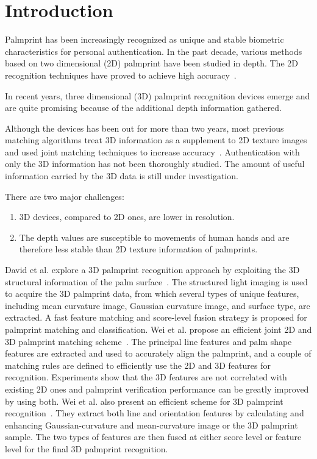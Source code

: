 \chapter{Introduction\label{ch:intro}}

Palmprint has been increasingly recognized as unique and stable biometric characteristics for personal authentication. In the past decade, various methods based on two dimensional (2D) palmprint have been studied in depth. The 2D recognition techniques have proved to achieve high accuracy~\cite{Kong:2009hj}.

In recent years, three dimensional (3D) palmprint recognition devices emerge and are quite promising because of the additional depth information gathered.

Although the devices has been out for more than two years, most previous matching algorithms treat 3D information as a supplement to 2D texture images and used joint matching techniques to increase accuracy~\cite{Li:2011ur, Li:2010en, Zhang:2009dp, Zhang:2008kc, Zhang:2010uu}. Authentication with only the 3D information has not been thoroughly studied. The amount of useful information carried by the 3D data is still under investigation.

There are two major challenges:

\begin{enumerate}
\item 3D devices, compared to 2D ones, are lower in resolution.
\item The depth values are susceptible to movements of human hands and are therefore less stable than 2D texture information of palmprints.
\end{enumerate}

David et al. explore a 3D palmprint recognition approach by exploiting the 3D structural information of the palm surface~\cite{Zhang:2009dp, Zhang:2008kc}. The structured light imaging is used to acquire the 3D palmprint data, from which several types of unique features, including mean curvature image, Gaussian curvature image, and surface type, are extracted. A fast feature matching and score-level fusion strategy is proposed for palmprint matching and classification. Wei et al. propose an efficient joint 2D and 3D palmprint matching scheme~\cite{Li:2010en}. The principal line features and palm shape features are extracted and used to accurately align the palmprint, and a couple of matching rules are defined to efficiently use the 2D and 3D features for recognition. Experiments show that the 3D features are not correlated with existing 2D ones and palmprint verification performance can be greatly improved by using both. Wei et al. also present an efficient scheme for 3D palmprint recognition~\cite{Li:2011ur}. They extract both line and orientation features by calculating and enhancing Gaussian-curvature and mean-curvature image or the 3D palmprint sample. The two types of features are then fused at either score level or feature level for the final 3D palmprint recognition.

